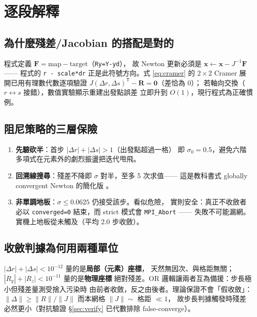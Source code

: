 \documentclass[11pt,a4paper]{article}
\newcommand{\code}[1]{\texttt{#1}}
\begin{document}
\section{逐段解釋}
\label{sec:explain}

\subsection{為什麼殘差/Jacobian 的搭配是對的}
程式定義 $\bm{F}=\text{map}-\text{target}$（\code{Ry=Y-yd}），
故 Newton 更新必須是 $\bm{x}\leftarrow\bm{x}-J^{-1}\bm{F}$ ——
程式的 \code{r - scale*dr} 正是此符號方向。式 \eqref{eq:cramer} 的
$2\times2$ Cramer 展開已用有理數代數逐項驗證
$J(\Delta r,\Delta s)^{\mathsf T}-\bm{R}=\bm{0}$（差恰為 0）；
若軸向交換（$r\leftrightarrow s$ 接錯），數值實驗顯示重建出發點誤差
立即升到 $O(1)$，現行程式為正確慣例。

\subsection{阻尼策略的三層保險}
\begin{enumerate}[itemsep=1pt]
\item \textbf{先驗砍半}：首步 $|\Delta r|+|\Delta s|>1$（出發點超過一格）
      即 $\sigma_0=0.5$，避免六階多項式在元素外的劇烈振盪把迭代甩飛。
\item \textbf{回溯線搜尋}：殘差不降即 $\sigma$ 對半，至多 5 次求值——
      這是教科書式 globally convergent Newton 的簡化版
      \cite{Press2007}。
\item \textbf{非單調地板}：$\sigma\le0.0625$ 仍接受該步。看似危險，
      實則安全：真正不收斂者必以 \code{converged=0} 結束，而
      strict 模式會 \code{MPI\_Abort} —— 失敗不可能漏網。
      實機上地板從未觸及（平均 2.0 步收斂）。
\end{enumerate}

\subsection{收斂判據為何用兩種單位}
$|\Delta r|+|\Delta s|<10^{-12}$ 量的是\textbf{局部（元素）座標}，
天然無因次、與格距無關；$|R_y|+|R_z|<10^{-11}$ 量的是\textbf{物理座標}
絕對殘差。OR 邏輯讓兩者互為備援：步長極小但殘差量測受捨入污染時
由前者收斂，反之由後者。理論保證不會「假收斂」：
$\|\Delta\|\ge\|R\|/\|J\|$ 而本網格 $\|J\|\sim$ 格距 $\ll1$，
故步長判據觸發時殘差必然更小（對抗驗證 \S\ref{sec:verify} 已代數排除
false-converge）。
\end{document}
